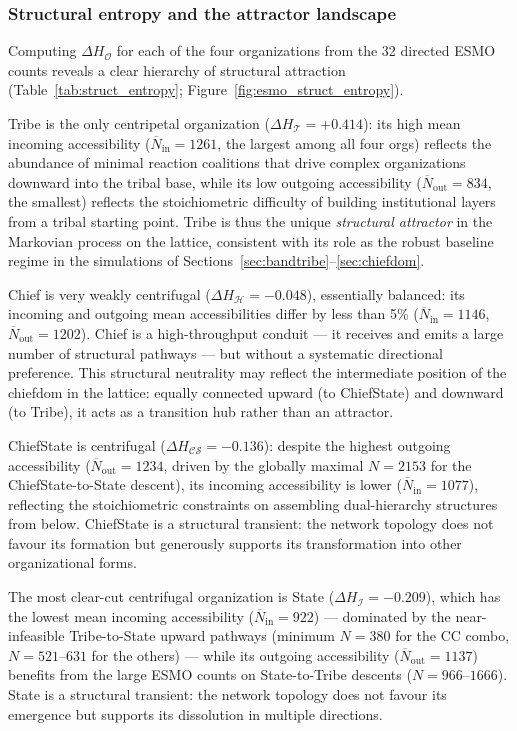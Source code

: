 \subsubsection*{Structural entropy and the attractor landscape}

Computing $\Delta H_{\mathcal{O}}$ for each of the four organizations from
the 32 directed ESMO counts reveals a clear hierarchy of structural
attraction (Table~\ref{tab:struct_entropy};
Figure~\ref{fig:esmo_struct_entropy}).

Tribe is the only centripetal organization ($\Delta H_{\mathcal{T}} =
+0.414$): its high mean incoming accessibility
($\overline{N}_{\text{in}} = 1261$, the largest among all four orgs)
reflects the abundance of minimal reaction coalitions that drive complex
organizations downward into the tribal base, while its low outgoing
accessibility ($\overline{N}_{\text{out}} = 834$, the smallest) reflects
the stoichiometric difficulty of building institutional layers from a tribal
starting point.  Tribe is thus the unique \emph{structural attractor} in
the Markovian process on the lattice, consistent with its role as the robust
baseline regime in the simulations of
Sections~\ref{sec:bandtribe}--\ref{sec:chiefdom}.

Chief is very weakly centrifugal ($\Delta H_{\mathcal{H}} = -0.048$),
essentially balanced: its incoming and outgoing mean accessibilities differ
by less than 5\% ($\overline{N}_{\text{in}} = 1146$,
$\overline{N}_{\text{out}} = 1202$).  Chief is a high-throughput conduit
--- it receives and emits a large number of structural pathways --- but
without a systematic directional preference.  This structural neutrality
may reflect the intermediate position of the chiefdom in the lattice:
equally connected upward (to ChiefState) and downward (to Tribe), it
acts as a transition hub rather than an attractor.

ChiefState is centrifugal ($\Delta H_{\mathcal{CS}} = -0.136$): despite
the highest outgoing accessibility ($\overline{N}_{\text{out}} = 1234$,
driven by the globally maximal $N = 2153$ for the ChiefState-to-State
descent), its incoming accessibility is lower
($\overline{N}_{\text{in}} = 1077$), reflecting the stoichiometric
constraints on assembling dual-hierarchy structures from below.
ChiefState is a structural transient: the network topology does not
favour its formation but generously supports its transformation into
other organizational forms.

The most clear-cut centrifugal organization is State
($\Delta H_{\mathcal{I}} = -0.209$), which has the lowest mean incoming
accessibility ($\overline{N}_{\text{in}} = 922$) --- dominated by the
near-infeasible Tribe-to-State upward pathways (minimum $N = 380$ for
the CC combo, $N = 521$--$631$ for the others) --- while its outgoing
accessibility ($\overline{N}_{\text{out}} = 1137$) benefits from the
large ESMO counts on State-to-Tribe descents ($N = 966$--$1666$).
State is a structural transient: the network topology does not favour its
emergence but supports its dissolution in multiple directions.

